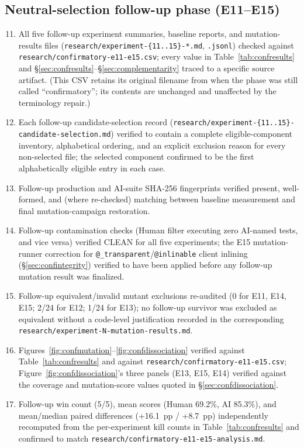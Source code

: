 \documentclass[10pt,conference]{IEEEtran}
\begin{document}
\subsection{Neutral-selection follow-up phase (E11--E15)}
\begin{enumerate}
\setcounter{enumi}{10}
\item All five follow-up experiment summaries, baseline reports, and mutation-results files (\texttt{research/experiment-\{11..15\}-*.md}, \texttt{.jsonl}) checked against \texttt{research/confirmatory-e11-e15.csv}; every value in Table~\ref{tab:confresults} and \S\ref{sec:confresults}--\S\ref{sec:complementarity} traced to a specific source artifact. (This CSV retains its original filename from when the phase was still called ``confirmatory''; its contents are unchanged and unaffected by the terminology repair.)
\item Each follow-up candidate-selection record (\texttt{research/experiment-\{11..15\}-candidate-selection.md}) verified to contain a complete eligible-component inventory, alphabetical ordering, and an explicit exclusion reason for every non-selected file; the selected component confirmed to be the first alphabetically eligible entry in each case.
\item Follow-up production and AI-suite SHA-256 fingerprints verified present, well-formed, and (where re-checked) matching between baseline measurement and final mutation-campaign restoration.
\item Follow-up contamination checks (Human filter executing zero AI-named tests, and vice versa) verified CLEAN for all five experiments; the E15 mutation-runner correction for \texttt{@\_transparent}/\texttt{@inlinable} client inlining (\S\ref{sec:confintegrity}) verified to have been applied before any follow-up mutation result was finalized.
\item Follow-up equivalent/invalid mutant exclusions re-audited (0 for E11, E14, E15; 2/24 for E12; 1/24 for E13); no follow-up survivor was excluded as equivalent without a code-level justification recorded in the corresponding \texttt{research/experiment-N-mutation-results.md}.
\item Figures~\ref{fig:confmutation}--\ref{fig:confdissociation} verified against Table~\ref{tab:confresults} and against \texttt{research/confirmatory-e11-e15.csv}; Figure~\ref{fig:confdissociation}'s three panels (E13, E15, E14) verified against the coverage and mutation-score values quoted in \S\ref{sec:confdissociation}.
\item Follow-up win count (5/5), mean scores (Human 69.2\%, AI 85.3\%), and mean/median paired differences (+16.1~pp / +8.7~pp) independently recomputed from the per-experiment kill counts in Table~\ref{tab:confresults} and confirmed to match \texttt{research/confirmatory-e11-e15-analysis.md}.

\end{enumerate}
\end{document}
